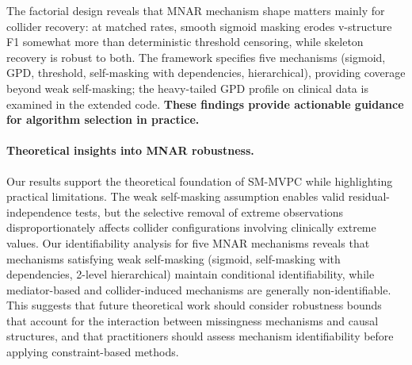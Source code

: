 \documentclass[runningheads]{llncs}
\begin{document}
The factorial design reveals that MNAR mechanism shape matters mainly for collider recovery: at matched rates, smooth sigmoid masking erodes v-structure F1 somewhat more than deterministic threshold censoring, while skeleton recovery is robust to both. The framework specifies five mechanisms (sigmoid, GPD, threshold, self-masking with dependencies, hierarchical), providing coverage beyond weak self-masking; the heavy-tailed GPD profile on clinical data is examined in the extended code. \textbf{These findings provide actionable guidance for algorithm selection in practice.}

\paragraph{Theoretical insights into MNAR robustness.}
Our results support the theoretical foundation of SM-MVPC while highlighting practical limitations. The weak self-masking assumption enables valid residual-independence tests, but the selective removal of extreme observations disproportionately affects collider configurations involving clinically extreme values. Our identifiability analysis for five MNAR mechanisms reveals that mechanisms satisfying weak self-masking (sigmoid, self-masking with dependencies, 2-level hierarchical) maintain conditional identifiability, while mediator-based and collider-induced mechanisms are generally non-identifiable. This suggests that future theoretical work should consider robustness bounds that account for the interaction between missingness mechanisms and causal structures, and that practitioners should assess mechanism identifiability before applying constraint-based methods.
\end{document}
